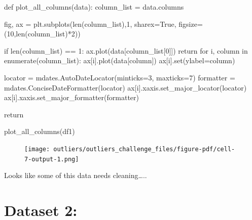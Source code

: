 \documentclass[
  letterpaper,
  DIV=11,
  numbers=noendperiod,
  oneside]{scrreprt}
\newenvironment{Shaded}{\begin{snugshade}}{\end{snugshade}}
\newcommand{\BuiltInTok}[1]{\textcolor[rgb]{0.00,0.23,0.31}{#1}}
\newcommand{\ControlFlowTok}[1]{\textcolor[rgb]{0.00,0.23,0.31}{#1}}
\newcommand{\DecValTok}[1]{\textcolor[rgb]{0.68,0.00,0.00}{#1}}
\newcommand{\KeywordTok}[1]{\textcolor[rgb]{0.00,0.23,0.31}{#1}}
\newcommand{\NormalTok}[1]{\textcolor[rgb]{0.00,0.23,0.31}{#1}}
\newcommand{\OperatorTok}[1]{\textcolor[rgb]{0.37,0.37,0.37}{#1}}
\newcommand{\VariableTok}[1]{\textcolor[rgb]{0.07,0.07,0.07}{#1}}
\begin{document}
\begin{Shaded}
\begin{Highlighting}[]
\KeywordTok{def}\NormalTok{ plot\_all\_columns(data):}
\NormalTok{    column\_list }\OperatorTok{=}\NormalTok{ data.columns}
    
\NormalTok{    fig, ax }\OperatorTok{=}\NormalTok{ plt.subplots(}\BuiltInTok{len}\NormalTok{(column\_list),}\DecValTok{1}\NormalTok{, sharex}\OperatorTok{=}\VariableTok{True}\NormalTok{, figsize}\OperatorTok{=}\NormalTok{(}\DecValTok{10}\NormalTok{,}\BuiltInTok{len}\NormalTok{(column\_list)}\OperatorTok{*}\DecValTok{2}\NormalTok{))}

    \ControlFlowTok{if} \BuiltInTok{len}\NormalTok{(column\_list) }\OperatorTok{==} \DecValTok{1}\NormalTok{:}
\NormalTok{        ax.plot(data[column\_list[}\DecValTok{0}\NormalTok{]])}
        \ControlFlowTok{return}
    \ControlFlowTok{for}\NormalTok{ i, column }\KeywordTok{in} \BuiltInTok{enumerate}\NormalTok{(column\_list):}
\NormalTok{        ax[i].plot(data[column])}
\NormalTok{        ax[i].}\BuiltInTok{set}\NormalTok{(ylabel}\OperatorTok{=}\NormalTok{column)}
    
\NormalTok{    locator }\OperatorTok{=}\NormalTok{ mdates.AutoDateLocator(minticks}\OperatorTok{=}\DecValTok{3}\NormalTok{, maxticks}\OperatorTok{=}\DecValTok{7}\NormalTok{)}
\NormalTok{    formatter }\OperatorTok{=}\NormalTok{ mdates.ConciseDateFormatter(locator)}
\NormalTok{    ax[i].xaxis.set\_major\_locator(locator)}
\NormalTok{    ax[i].xaxis.set\_major\_formatter(formatter)}

    \ControlFlowTok{return}
\end{Highlighting}
\end{Shaded}

\begin{Shaded}
\begin{Highlighting}[]
\NormalTok{plot\_all\_columns(df1)}
\end{Highlighting}
\end{Shaded}

\begin{figure}[H]

{\centering \texttt{[image: outliers/outliers\_challenge\_files/figure-pdf/cell-7-output-1.png]}

}

\end{figure}

Looks like some of this data needs cleaning\ldots..

\hypertarget{dataset-2}{%
\section{Dataset 2:}\label{dataset-2}}
\end{document}
